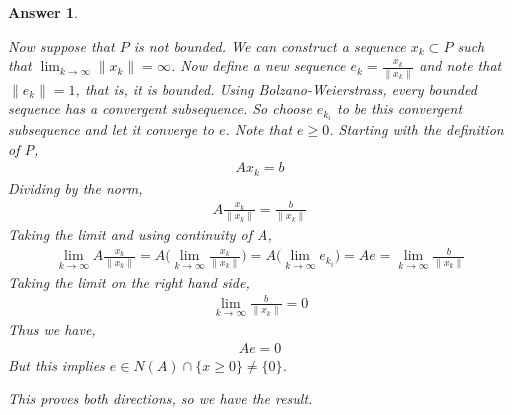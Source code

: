 \documentclass[12pt]{article}
\theoremstyle{colon}
\newtheorem*{answer}{Answer}
\begin{document}
\begin{answer}
\begin{enumerate}
    Now suppose that $P$ is not bounded. We can construct a sequence $x_k \subset P$ such that $\lim_{k \rightarrow \infty} \lVert x_k \rVert = \infty$. Now define a new sequence $e_k = \frac{x_k}{\lVert x_k \rVert}$ and note that $\lVert e_k \rVert = 1$, that is, it is bounded. Using Bolzano-Weierstrass, every bounded sequence has a convergent subsequence. So choose $e_{k_i}$ to be this convergent subsequence and let it converge to $e$. Note that $e \geq 0$. Starting with the definition of P,
    \begin{gather*}
      A x_k = b
    \end{gather*}
    Dividing by the norm,
    \begin{gather*}
      A \frac{x_k}{\lVert x_k \rVert} = \frac{b}{\lVert x_k \rVert}
    \end{gather*}
    Taking the limit and using continuity of A,
    \begin{gather*}
      \lim_{k \rightarrow \infty} A \frac{x_k}{\lVert x_k \rVert} = A \big( \lim_{k \rightarrow \infty} \frac{x_k}{\lVert x_k \rVert} \big) = A \big( \lim_{k \rightarrow \infty} e_{k_i} \big) = A e = \lim_{k \rightarrow \infty} \frac{b}{\lVert x_k \rVert}
    \end{gather*}
    Taking the limit on the right hand side,
    \begin{gather*}
      \lim_{k \rightarrow \infty} \frac{b}{\lVert x_k \rVert} = 0
    \end{gather*}
    Thus we have,
    \begin{gather*}
      Ae = 0
    \end{gather*}
    But this implies $e \in N(A) \cap \{ x \geq 0 \} \neq \{ 0 \}$.

    This proves both directions, so we have the result.
  \end{enumerate}
\end{answer}
  \clearpage
\end{document}
